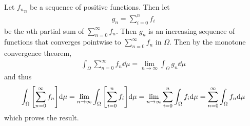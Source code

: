 \documentclass[12pt]{article}
\theoremstyle{plain}
\begin{document}
Let ${f_n}_n$ be a sequence of positive functions.  Then let
\begin{align*}
    g_n = \sum_{i = 0}^n f_i
\end{align*}
be the $n$th partial sum of $\sum_{n = 0}^\infty f_n$.  Then $g_n$ is an increasing sequence of functions that converges pointwise to $\sum_{n = 0}^\infty f_n$ in $\Omega$.  Then by the monotone convergence theorem,
\begin{align*}
    \int_\Omega \sum_{n = 0}^\infty f_n \dd \mu= \lim_{n\rightarrow \infty}\int_\Omega g_n \dd \mu
\end{align*}
and thus
\begin{align*}
    \int_\Omega \qty[\sum_{n = 0}^\infty f_n] \dd \mu = \lim_{n\rightarrow \infty}\int_\Omega \qty[\sum_{i=0}^n f_i] \dd \mu = \lim_{n\rightarrow \infty} \sum_{i = 0}^n \int_\Omega f_i \dd \mu = \sum_{n = 0}^\infty \int_\Omega f_n \dd \mu
\end{align*}
which proves the result.
\end{document}
